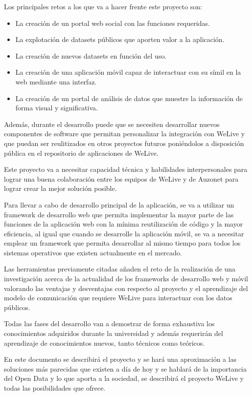 \documentclass{DeustoFDP}
\begin{document}
Los principales retos a los que va a hacer frente este proyecto son:

\begin{itemize}
    \item La creación de un portal web social con las funciones requeridas.
    \item La explotación de datasets públicos que aporten valor a la aplicación.
    \item La creación de nuevos datasets en función del uso.
    \item La creación de una aplicación móvil capaz de interactuar con su símil en la web mediante una interfaz.
    \item La creación de un portal de análisis de datos que muestre la información de forma visual y significativa.
\end{itemize}

Además, durante el desarrollo puede que se necesiten desarrollar nuevos componentes de software que permitan personalizar la integración con WeLive y que puedan ser reulitizados en otros proyectos futuros poniéndolos a disposición pública en el repositorio de aplicaciones de WeLive.

Este proyecto va a necesitar capacidad técnica y habilidades interpersonales para lograr una buena colaboración entre los equipos de WeLive y de Auzonet para lograr crear la mejor solución posible.

Para llevar a cabo de desarrollo principal de la aplicación, se va a utilizar un framework de desarrollo web que permita implementar la mayor parte de las funciones de la aplicación web con la mínima reutilización de código y la mayor eficiencia, al igual que cuando se desarrolle la aplicación móvil, se va a necesitar emplear un framework que permita desarrollar al mismo tiempo para todos los sistemas operativos que existen actualmente en el mercado.

Las herramientas previamente citadas añaden el reto de la realización de una investigación acerca de la actualidad de los frameworks de desarrollo web y móvil valorando las ventajas y desventajas con respecto al proyecto y el aprendizaje del modelo de comunicación que requiere WeLive para interactuar con los datos públicos.

Todas las fases del desarrollo van a demostrar de forma exhaustiva los conocimientos adquiridos durante la universidad y además requerirán del aprendizaje de conocimientos nuevos, tanto técnicos como teóricos.

En este documento se describirá el proyecto y se hará una aproximación a las soluciones más parecidas que existen a día de hoy y se hablará de la importancia del Open Data y lo que aporta a la sociedad, se describirá el proyecto WeLive y todas las posibilidades que ofrece.
\end{document}
